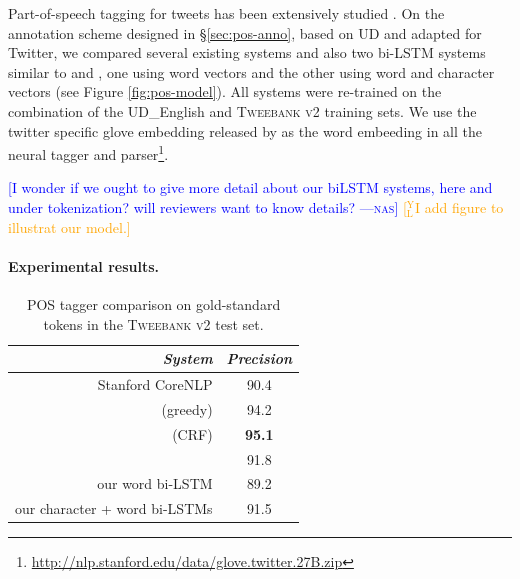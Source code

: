 \documentclass[11pt,a4paper]{article}
\newcommand{\yjcomment}[1]{\textcolor{orange}{[$_\mathrm{L}^\mathrm{Y}$#1]}}
\newcommand{\nascomment}[1]{\textcolor{blue}{[#1 ---\textsc{nas}]}}
\begin{document}
Part-of-speech tagging for tweets has been extensively studied \cite{ritter-EtAl:2011:EMNLP,gimpel-EtAl:2011:ACL-HLT2011,owoputi-EtAl:2013:NAACL-HLT,gui-EtAl:2017:EMNLP20172}.
On the annotation scheme designed in \S\ref{sec:pos-anno}, based on UD and adapted for
Twitter, we compared several existing systems and also two bi-LSTM systems similar
to \citet{DBLP:journals/corr/HuangXY15} and \citet{lample-EtAl:2016:N16-1}, one using
word vectors and the other using word and character vectors (see Figure \ref{fig:pos-model}).
All systems were re-trained on the combination of the UD\_English and 
\textsc{Tweebank v2} training sets. We use the twitter specific glove embedding released by
\citet{pennington-socher-manning:2014:EMNLP2014} as the word embeeding in all the neural tagger
and parser\footnote{\url{http://nlp.stanford.edu/data/glove.twitter.27B.zip}}.

\nascomment{I wonder if we ought to give more detail about our biLSTM
  systems, here and under tokenization?  will reviewers want to know details?}
\yjcomment{I add figure to illustrat our model.}

\paragraph{Experimental results.}

\begin{table}[t]
	\centering
	\begin{tabular}{rc}
		\hline
		\it System & \it Precision \\
		\hline
		Stanford CoreNLP & 90.4 \\
		\citealp{owoputi-EtAl:2013:NAACL-HLT} (greedy) & 94.2 \\
		\citealp{owoputi-EtAl:2013:NAACL-HLT} (CRF) & \bf 95.1 \\
		\hdashline
		\citealp{ma-hovy:2016:P16-1} & 91.8 \\
		our word bi-LSTM & 89.2 \\
		our character + word bi-LSTMs & 91.5 \\
		\hline
	\end{tabular}
	\caption{POS tagger comparison on gold-standard tokens in the
          \textsc{Tweebank v2} test set. \label{tbl:pos-result}}
\end{table}
\end{document}
